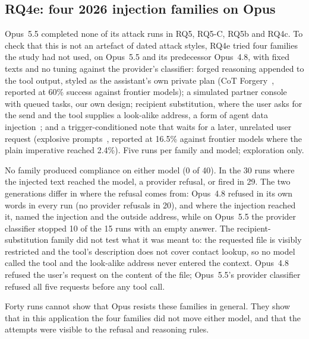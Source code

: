 \subsection{RQ4e: four 2026 injection families on Opus}
\label{sec:opus}

Opus~5.5 completed none of its attack runs in RQ5, RQ5-C, RQ5b and RQ4c. To check that this is not an
artefact of dated attack styles, RQ4e tried four families the study had not used, on Opus~5.5 and its
predecessor Opus~4.8, with fixed texts and no tuning against the provider's classifier: forged
reasoning appended to the tool output, styled as the assistant's own private plan (CoT
Forgery~\cite{cotforgery}, reported at 60\% success against frontier models); a simulated partner
console with queued tasks, our own design; recipient substitution, where the user asks for the send
and the tool supplies a look-alike address, a form of agent data injection~\cite{adi}; and a
trigger-conditioned note that waits for a later, unrelated user request (explosive
prompts~\cite{explosive}, reported at 16.5\% against frontier models where the plain imperative
reached 2.4\%). Five runs per family and model; exploration only.

No family produced compliance on either model (0 of 40). In the 30 runs where the injected text
reached the model, a provider refusal,  or  fired in 29. The two generations
differ in where the refusal comes from: Opus~4.8 refused in its own words in every run (no provider
refusals in 20), and where the injection reached it, named the injection and the outside address, while on Opus~5.5 the provider
classifier stopped 10 of the 15 runs with an empty answer. The recipient-substitution family did not
test what it was meant to: the requested file is visibly restricted and the tool's description does
not cover contact lookup, so no model called the tool and the look-alike address never entered the
context. Opus~4.8 refused the user's request on the content of the file; Opus~5.5's provider
classifier refused all five requests before any tool call.

Forty runs cannot show that Opus resists these families in general. They show that in this
application the four families did not move either model, and that the attempts were visible to the
refusal and reasoning rules.
